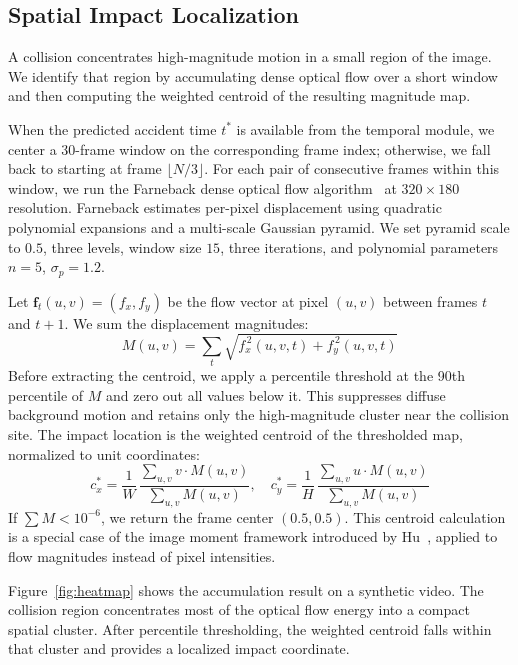 \subsection{Spatial Impact Localization}

A collision concentrates high-magnitude motion in a small region of the image. We identify that region by accumulating dense optical flow over a short window and then computing the weighted centroid of the resulting magnitude map.

When the predicted accident time $t^{*}$ is available from the temporal module, we center a 30-frame window on the corresponding frame index; otherwise, we fall back to starting at frame $\lfloor N/3 \rfloor$. For each pair of consecutive frames within this window, we run the Farneback dense optical flow algorithm~\cite{farneback2003two} at $320 \times 180$ resolution. Farneback estimates per-pixel displacement using quadratic polynomial expansions and a multi-scale Gaussian pyramid. We set pyramid scale to $0.5$, three levels, window size $15$, three iterations, and polynomial parameters $n = 5$, $\sigma_p = 1.2$.

Let $\mathbf{f}_t(u,v) = (f_x, f_y)$ be the flow vector at pixel $(u,v)$ between frames $t$ and $t{+}1$. We sum the displacement magnitudes:
\begin{equation}
    M(u,v) = \sum_{t} \sqrt{f_{x}^{\,2}(u,v,t) + f_{y}^{\,2}(u,v,t)}
    \label{eq:magmap}
\end{equation}
Before extracting the centroid, we apply a percentile threshold at the 90th percentile of $M$ and zero out all values below it. This suppresses diffuse background motion and retains only the high-magnitude cluster near the collision site. The impact location is the weighted centroid of the thresholded map, normalized to unit coordinates:
\begin{equation}
    c_x^{*} = \frac{1}{W}\,\frac{\sum_{u,v} v \cdot M(u,v)}{\sum_{u,v} M(u,v)}, \quad
    c_y^{*} = \frac{1}{H}\,\frac{\sum_{u,v} u \cdot M(u,v)}{\sum_{u,v} M(u,v)}
    \label{eq:centroid}
\end{equation}
If $\sum M < 10^{-6}$, we return the frame center $(0.5, 0.5)$. This centroid calculation is a special case of the image moment framework introduced by Hu~\cite{hu1962visual}, applied to flow magnitudes instead of pixel intensities.

Figure~\ref{fig:heatmap} shows the accumulation result on a synthetic video. The collision region concentrates most of the optical flow energy into a compact spatial cluster. After percentile thresholding, the weighted centroid falls within that cluster and provides a localized impact coordinate.

